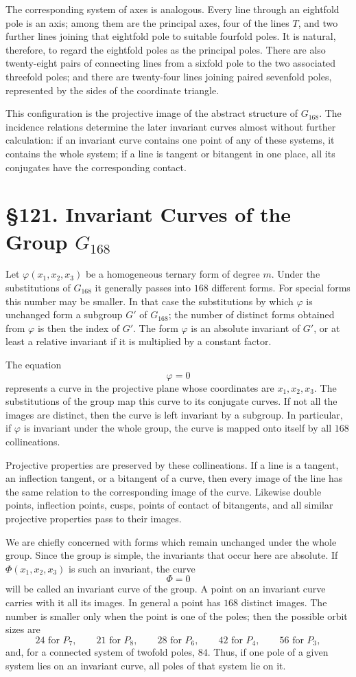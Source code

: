 \documentclass[12pt,a4paper]{article}
\newcommand{\webersection}[2]{\clearpage\section*{\S #1. #2}\addcontentsline{toc}{section}{\S #1. #2}}
\begin{document}
The corresponding system of axes is analogous.  Every line through an eightfold pole is an axis; among them are the principal axes, four of the lines \(T\), and two further lines joining that eightfold pole to suitable fourfold poles.  It is natural, therefore, to regard the eightfold poles as the principal poles.  There are also twenty-eight pairs of connecting lines from a sixfold pole to the two associated threefold poles; and there are twenty-four lines joining paired sevenfold poles, represented by the sides of the coordinate triangle.

This configuration is the projective image of the abstract structure of \(G_{168}\).  The incidence relations determine the later invariant curves almost without further calculation: if an invariant curve contains one point of any of these systems, it contains the whole system; if a line is tangent or bitangent in one place, all its conjugates have the corresponding contact.

\webersection{121}{Invariant Curves of the Group \(G_{168}\)}

Let \(\varphi(x_1,x_2,x_3)\) be a homogeneous ternary form of degree \(m\).  Under the substitutions of \(G_{168}\) it generally passes into \(168\) different forms.  For special forms this number may be smaller.  In that case the substitutions by which \(\varphi\) is unchanged form a subgroup \(G'\) of \(G_{168}\); the number of distinct forms obtained from \(\varphi\) is then the index of \(G'\).  The form \(\varphi\) is an absolute invariant of \(G'\), or at least a relative invariant if it is multiplied by a constant factor.

The equation
\[
 \varphi=0
\]
represents a curve in the projective plane whose coordinates are \(x_1,x_2,x_3\).  The substitutions of the group map this curve to its conjugate curves.  If not all the images are distinct, then the curve is left invariant by a subgroup.  In particular, if \(\varphi\) is invariant under the whole group, the curve is mapped onto itself by all \(168\) collineations.

Projective properties are preserved by these collineations.  If a line is a tangent, an inflection tangent, or a bitangent of a curve, then every image of the line has the same relation to the corresponding image of the curve.  Likewise double points, inflection points, cusps, points of contact of bitangents, and all similar projective properties pass to their images.

We are chiefly concerned with forms which remain unchanged under the whole group.  Since the group is simple, the invariants that occur here are absolute.  If \(\Phi(x_1,x_2,x_3)\) is such an invariant, the curve
\[
 \Phi=0
\]
will be called an invariant curve of the group.  A point on an invariant curve carries with it all its images.  In general a point has \(168\) distinct images.  The number is smaller only when the point is one of the poles; then the possible orbit sizes are
\[
24\text{ for }P_7,
\qquad 21\text{ for }P_8,
\qquad 28\text{ for }P_6,
\qquad 42\text{ for }P_4,
\qquad 56\text{ for }P_3,
\]
and, for a connected system of twofold poles, \(84\).  Thus, if one pole of a given system lies on an invariant curve, all poles of that system lie on it.
\end{document}
